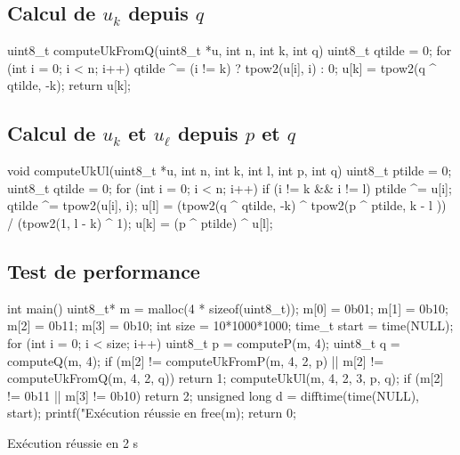 \documentclass[a4paper,french,bookmarks]{article}
\begin{document}
 \newpage
     \subsection{Calcul de $u_k$ depuis $q$}

    \begin{C}
uint8_t computeUkFromQ(uint8_t *u, int n,
    int k, int q)
{
    uint8_t qtilde = 0;
    for (int i = 0; i < n; i++)
        qtilde ^= (i != k) ? tpow2(u[i], i) : 0;
    u[k] = tpow2(q ^ qtilde, -k);
    return u[k];
}
    \end{C}

    \subsection{Calcul de $u_k$ et $u_\ell$ depuis $p$ et $q$}

    \begin{C}
void computeUkUl(uint8_t *u, int n, int k,
    int l, int p, int q)
{
    uint8_t ptilde = 0;
    uint8_t qtilde = 0;
    for (int i = 0; i < n; i++) {
        if (i != k && i != l) {
            ptilde ^= u[i];
            qtilde ^= tpow2(u[i], i);
        }
    }
    u[l] = (tpow2(q ^ qtilde, -k) ^
        tpow2(p ^ ptilde, k - l ))
        / (tpow2(1, l - k) ^ 1);
    u[k] = (p ^ ptilde) ^ u[l];
}
    \end{C}

    \newpage

    \subsection{Test de performance}
    
    \begin{C}
int main()
{
    uint8_t* m = malloc(4 * sizeof(uint8_t));
    m[0] = 0b01;
    m[1] = 0b10;
    m[2] = 0b11;
    m[3] = 0b10;
    int size = 10*1000*1000;
    time_t start = time(NULL);
    for (int i = 0; i < size; i++) {
        uint8_t p = computeP(m, 4);
        uint8_t q = computeQ(m, 4);
        if (m[2] != computeUkFromP(m, 4, 2, p) ||
        m[2] != computeUkFromQ(m, 4, 2, q))
            return 1;
        computeUkUl(m, 4, 2, 3, p, q);
        if (m[2] != 0b11 || m[3] != 0b10)
            return 2;
    }
    unsigned long d = difftime(time(NULL), start);
    printf("Exécution réussie en %
    free(m);
    return 0;
}
    \end{C}

    \medskip 
    \begin{outputlog}
        Exécution réussie en 2 s
    \end{outputlog}


    
\end{document}
